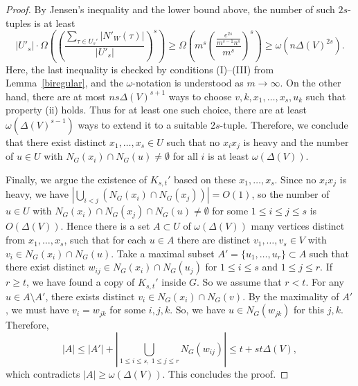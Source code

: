 \documentclass[11pt]{article}
\theoremstyle{definition}
\begin{document}
\begin{proof}
    By Jensen's inequality and the lower bound above, the number of such $2s$-tuples is at least\begin{equation*}
        |U'_s| \cdot \Omega\left(\left(\frac{\sum_{\tau\in U_s'} |N'_W(\tau)|}{|U'_s|}\right)^s\right) \geq \Omega\left( m^s\left(\frac{\frac{e^{2s}}{m^{s-1}n^{s}}}{m^s}\right)^s \right) \geq \omega\left(n\Delta(V)^{2s}\right).
    \end{equation*} Here, the last inequality is checked by conditions (I)--(III) from Lemma~\ref{biregular}, and the $\omega$-notation is understood as $m \to \infty$. On the other hand, there are at most $ns\Delta(V)^{s+1}$ ways to choose $v,k,x_1,\dots,x_s,u_k$ such that property (ii) holds. Thus for at least one such choice, there are at least $\omega(\Delta(V)^{s-1})$ ways to extend it to a suitable $2s$-tuple. Therefore, we conclude that there exist distinct $x_1,\dots,x_s \in U$ such that no $x_ix_j$ is heavy and the number of $u \in U$ with $N_G(x_i)\cap N_G(u) \neq \emptyset$ for all $i$ is at least $\omega(\Delta(V))$. 
    
    Finally, we argue the existence of $K_{s,t}'$ based on these $x_1,\dots,x_s$. Since no $x_ix_j$ is heavy, we have $|\bigcup_{i<j} (N_G(x_i)\cap N_G(x_j))| = O(1)$, so the number of $u \in U$ with $N_G(x_i)\cap N_G(x_j)\cap N_G(u)\neq \emptyset$ for some $1\leq i\leq j\leq s$ is $O(\Delta(V))$. Hence there is a set $A \subset U$ of $\omega(\Delta(V))$ many vertices distinct from $x_1,\dots,x_s$, such that for each $u \in A$ there are distinct $v_1,\dots,v_s \in V$ with $v_i\in N_G(x_i)\cap N_G(u)$. Take a maximal subset $ A'= \{u_1,\dots,u_r\}\subset A$ such that there exist distinct $w_{ij}\in N_G(x_i)\cap N_G(u_j)$ for $1\leq i\leq s$ and $1\leq j\leq r$. If $r\geq t$, we have found a copy of $K_{s,t}'$ inside $G$. So we assume that $r<t$. For any $u \in A \setminus A'$, there exists distinct $v_i \in N_G(x_i) \cap N_G(v)$. By the maximality of $A'$, we must have $v_i = w_{jk}$ for some $i,j,k$. So, we have $u \in N_G(w_{jk})$ for this $j,k$. Therefore, \begin{equation*}
        |A| \leq |A'| + |\bigcup_{1\leq i\leq s,~1\leq j\leq r} N_G(w_{ij})| \leq t + st\Delta(V),
    \end{equation*} which contradicts $|A| \geq \omega(\Delta(V))$. This concludes the proof.
\end{proof}
\end{document}
